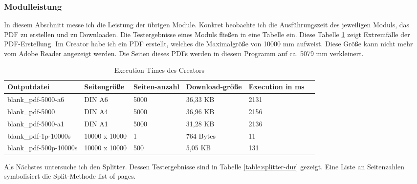 \subsubsection{Modulleistung}
In diesem Abschnitt messe ich die Leistung der übrigen Module. Konkret beobachte ich die Ausführungszeit des jeweiligen Moduls, das PDF zu erstellen und zu Downloaden. Die Testergebnisse eines Moduls fließen in eine Tabelle ein. Diese Tabelle \ref{table:creator-dur} zeigt Extremfälle der PDF-Erstellung. Im Creator habe ich ein PDF erstellt, welches die Maximalgröße von 10000 mm aufweist. Diese Größe kann nicht mehr vom Adobe Reader angezeigt werden. Die Seiten dieses PDFs werden in diesem Programm auf ca. 5079 mm verkleinert. 

\begin{table}[!htbp]
	\centering
	\begin{tabular}{|p{3cm}|p{3cm}|p{2cm}|p{2cm}|p{2cm}|p{2cm}|}
		\hline
		\textbf{Outputdatei}						& \textbf{Seitengröße}	& \textbf{Seiten-anzahl}	& \textbf{Download-größe}	& \textbf{Execution in ms} 	\\ 
		\hline
		blank\_pdf-5000-a6							& DIN A6 				& 5000 						& 36,33 KB 					& 2131  					\\
		blank\_pdf-5000								& DIN A4 				& 5000 						& 36,96 KB 					& 2156   					\\
		blank\_pdf-5000-a1							& DIN A1 				& 5000 						& 31,28 KB 					& 2136   					\\
		blank\_pdf-1p-10000s						& 10000 x 10000			& 1 						& 764 Bytes					& 11						\\	
		blank\_pdf-500p-10000s						& 10000 x 10000			& 500 						& 5,05 KB					& 131						\\	
		\hline
	\end{tabular}
	\caption{Execution Times des Creators}
	\label{table:creator-dur}
\end{table}

Als Nächstes untersuche ich den Splitter. Dessen Testergebnisse sind in Tabelle \ref{table:splitter-dur} gezeigt. Eine Liste an Seitenzahlen symbolisiert die Split-Methode list of pages.

